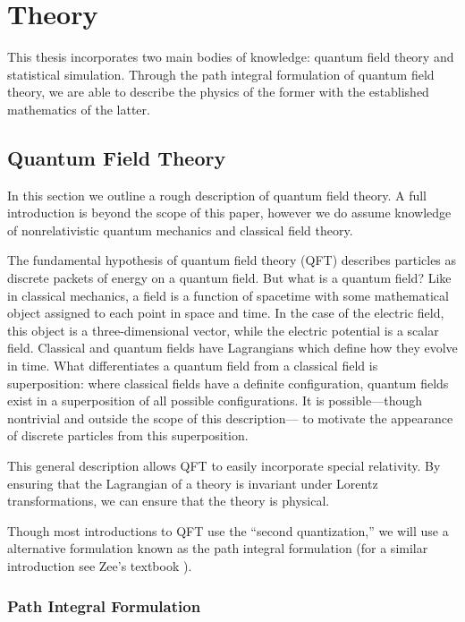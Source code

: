 \documentclass[12pt]{report}
\begin{document}
\chapter{Theory}

This thesis incorporates two main bodies of knowledge: quantum field theory and statistical simulation. Through the path integral formulation of quantum field theory, we are able to describe the physics of the former with the established mathematics of the latter.

\section{Quantum Field Theory}


In this section we outline a rough description of quantum field theory. A full introduction is beyond the scope of this paper, however we do assume knowledge of nonrelativistic quantum mechanics and classical field theory.

The fundamental hypothesis of quantum field theory (QFT) describes particles as discrete packets of energy on a quantum field. But what is a quantum field? Like in classical mechanics, a field is a function of spacetime with some mathematical object assigned to each point in space and time. In the case of the electric field, this object is a three-dimensional vector, while the electric potential is a scalar field. Classical and quantum fields have Lagrangians which define how they evolve in time. What differentiates a quantum field from a classical field is superposition: where classical fields have a definite configuration, quantum fields exist in a superposition of all possible configurations. It is possible---though nontrivial and outside the scope of this description--- to motivate the appearance of discrete particles from this superposition.

This general description allows QFT to easily incorporate special relativity. By ensuring that the Lagrangian of a theory is invariant under Lorentz transformations, we can ensure that the theory is physical. %

Though most introductions to QFT use the ``second quantization,'' we will use a alternative formulation known as the path integral formulation (for a similar introduction see Zee's textbook \cite{zee2010}).
 
\subsection{Path Integral Formulation}
\label{sec:pathintegral}
\end{document}
